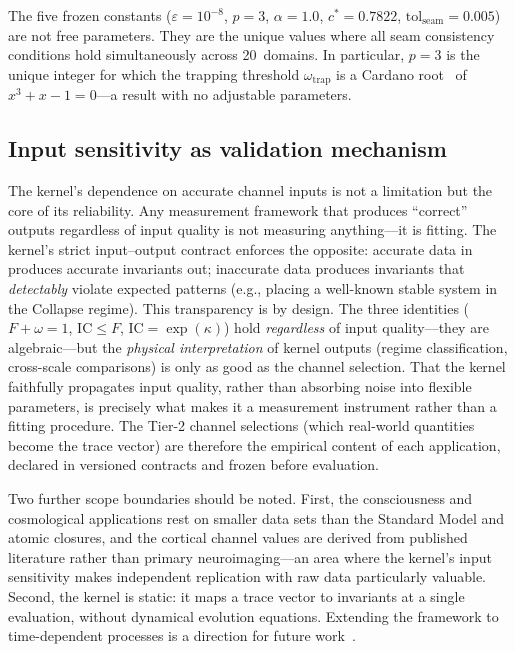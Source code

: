 \documentclass[
  aps,
  prx,
  twocolumn,
  superscriptaddress,
  nofootinbib,
  floatfix
]{revtex4-2}
\newcommand{\eps}{\varepsilon}
\newcommand{\IC}{\mathrm{IC}}
\begin{document}
The five frozen constants ($\eps = 10^{-8}$, $p = 3$,
$\alpha = 1.0$, $c^* = 0.7822$,
$\mathrm{tol}_{\mathrm{seam}} = 0.005$) are not free parameters.
They are the unique values where all seam consistency conditions
hold simultaneously across 20~domains. In particular, $p = 3$ is the
unique integer for which the trapping threshold
$\omega_{\mathrm{trap}}$ is a Cardano root~\cite{cardano1545} of
$x^3 + x - 1 = 0$---a result with no adjustable parameters.

\subsection{Input sensitivity as validation mechanism}

The kernel's dependence on accurate channel inputs is not a
limitation but the core of its reliability. Any measurement framework
that produces ``correct'' outputs regardless of input quality is not
measuring anything---it is fitting. The kernel's strict
input--output contract enforces the opposite: accurate data in
produces accurate invariants out; inaccurate data produces
invariants that \emph{detectably} violate expected patterns (e.g.,
placing a well-known stable system in the Collapse regime). This
transparency is by design. The three identities ($F + \omega = 1$,
$\IC \leq F$, $\IC = \exp(\kappa)$) hold \emph{regardless} of
input quality---they are algebraic---but the \emph{physical
interpretation} of kernel outputs (regime classification, cross-scale
comparisons) is only as good as the channel selection. That the
kernel faithfully propagates input quality, rather than absorbing
noise into flexible parameters, is precisely what makes it a
measurement instrument rather than a fitting procedure. The Tier-2
channel selections (which real-world quantities become the trace
vector) are therefore the empirical content of each application,
declared in versioned contracts and frozen before evaluation.

Two further scope boundaries should be noted. First, the
consciousness and cosmological applications rest on smaller data
sets than the Standard Model and atomic closures, and the cortical
channel values are derived from published literature rather than
primary neuroimaging---an area where the kernel's input sensitivity
makes independent replication with raw data particularly
valuable. Second, the kernel is static: it maps a trace vector to
invariants at a single evaluation, without dynamical evolution
equations. Extending the framework to time-dependent processes is a
direction for future work~\cite{paulus2025umcp}.
\end{document}
